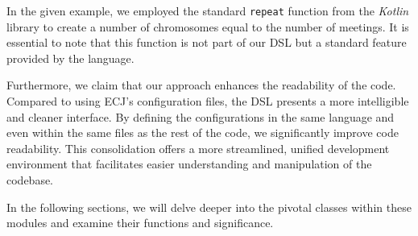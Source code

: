   In the given example, we employed the standard \texttt{repeat} function 
  from the \textit{Kotlin} library to create a number of chromosomes equal to 
  the number of meetings.
  It is essential to note that this function is not part of our DSL but a 
  standard feature provided by the language.

  Furthermore, we claim that our approach enhances the readability of the code.
  Compared to using ECJ's configuration files, the DSL presents a more 
  intelligible and cleaner interface.
  By defining the configurations in the same language and even within the 
  same files as the rest of the code, we significantly improve code 
  readability.
  This consolidation offers a more streamlined, unified development 
  environment that facilitates easier understanding and manipulation of the 
  codebase.

  In the following sections, we will delve deeper into the pivotal classes 
  within these modules and examine their functions and significance.
